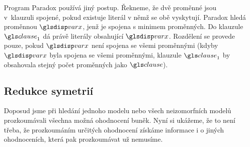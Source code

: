Program Paradox \cite{claessen03paradox} používá jiný postup.
Řekneme, že dvě proměnné jsou v~klauzuli spojené, pokud
existuje literál v němž se obě vyskytují.
Paradox hledá proměnnou $\var$, jenž je spojena s minimem proměnných.
Do klauzule $\clause_1$ dá právě literály obsahující $\var$.
Rozdělení se provede pouze, pokud $\var$ není spojena se všemi proměnnými
(kdyby $\var$ byla spojena se všemi proměnnými, klauzule $\clause_1$
by obsahovala stejný počet proměnných jako $\clause$).

%
%
%
%
%
%

\subsection{Redukce symetrií}

Doposud jsme při hledání jednoho modelu nebo všech neizomorfních modelů
prozkoumávali všechna možná ohodnocení buněk. Nyní si ukážeme,
že to není třeba, že prozkoumáním určitých ohodnocení získáme
informace i o jiných ohodnoceních, která pak prozkoumávat už nemusíme.


